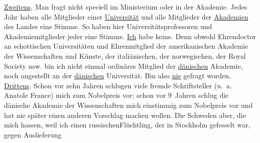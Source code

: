 {\begin{ledgroupsized}[t]{13cm}
           {\pb}\uline{Zweitens}. Man fragt nicht speciell im Ministerium oder in der Akademie. Jedes Jahr haben alle Mitglieder
                    einer \uline{Universität} und alle Mitglieder der \uline{Akademien} des Landes eine Stimme. So haben hier
                    Universitätsprofessoren und Akademiemitglieder jeder eine Stimme.\pend
           \pstart
           \uline{Ich} habe keine. Denn obwohl Ehrendoctor an schottischen Universitäten und Ehrenmitglied
                    der amerikanischen Akademie der Wissenschaften und
                        Künste, der italiänischen, der norwegischen, der Royal Society usw.
                    bin ich nicht einmal ordinäres Mitglied der \uline{dänischen} Akademie, noch angestellt an
                    der \uline{dänischen} Universität.\pend
           \pstart
           Bin also \uline{nie} gefragt worden.\pend
           \pstart
           \uline{Drittens}. Schon vor zehn Jahren schlugen viele
                    fremde Schriftsteller (u. a. Anatole France)
                    mich zum Nobelpreis vor; schon vor 9 Jahren
                    schlug {\pb}die dänische Akademie der Wissenschaften mich einstimmig zum Nobelpreis vor und hat nie später einen anderen
                    Vorschlag machen wollen. Die Schweden aber,
                    die mich hassen, weil ich einen russischenFlüchtling, der in Stockholm gefesselt war, gegen Auslieferung

\end{ledgroupsized}}
